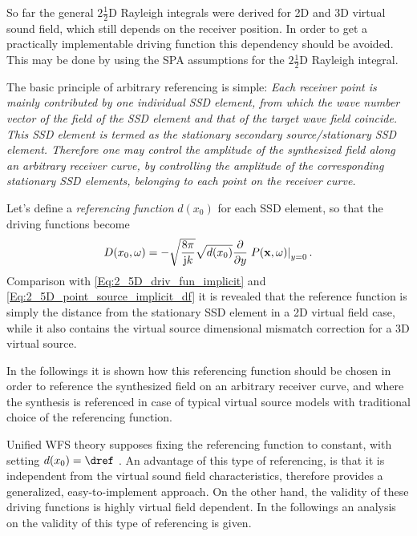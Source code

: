 So far the general $2\frac{1}{2}$D Rayleigh integrals were derived for 2D and 3D virtual sound field, which still depends on the receiver position. In order to get a practically implementable driving function this dependency should be avoided. 
This may be done by using the SPA assumptions for the $2\frac{1}{2}$D Rayleigh integral.

The basic principle of arbitrary referencing is simple:
\emph{Each receiver point is mainly contributed by one individual SSD element, from which the wave number vector of the field of the SSD element and that of the target wave field coincide. This SSD element is termed as the stationary secondary source/stationary SSD element.
Therefore one may control the amplitude of the synthesized field along an arbitrary receiver curve, by controlling the amplitude of the corresponding stationary SSD elements, belonging to each point on the receiver curve.}
 
\vspace{3mm}
Let's define a \emph{referencing function} $d(x_0)$ for each SSD element, so that the driving functions become
\begin{equation}
D(x_0,\omega) = 
- \sqrt{\frac{8\pi}{\mathrm{j} k}} \sqrt{d(x_0)} \frac{\partial}{\partial y} \left. P(\mathbf{x},\omega) \right|_{y = 0}.
\label{Eq:Gen_rayleigh_dx0}
\end{equation}
Comparison with \eqref{Eq:2_5D_driv_fun_implicit} and \eqref{Eq:2_5D_point_source_implicit_df} it is revealed that the reference function is simply the distance from the stationary SSD element in a 2D virtual field case, while it also contains the virtual source dimensional mismatch correction for a 3D virtual source.

In the followings it is shown how this referencing function should be chosen in order to reference the synthesized field on an arbitrary receiver curve, and where the synthesis is referenced in case of typical virtual source models with traditional choice of the referencing function.  

Unified WFS theory supposes fixing the referencing function to constant, with setting $d(x_0) = \dref$ \cite{Ahrens2012}.
An advantage of this type of referencing, is that it is independent from the virtual sound field characteristics, therefore provides a generalized, easy-to-implement approach. On the other hand, the validity of these driving functions is highly virtual field dependent. In the followings an analysis on the validity of this type of referencing is given.  


